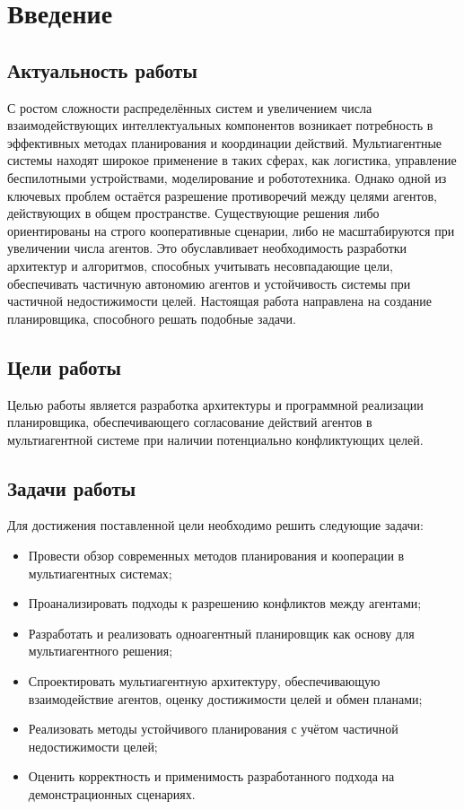 \chapter*{Введение}

\section*{Актуальность работы}

С ростом сложности распределённых систем и увеличением числа взаимодействующих
интеллектуальных компонентов возникает потребность
в эффективных методах планирования и координации действий.
Мультиагентные системы находят широкое применение в таких сферах,
как логистика, управление беспилотными устройствами,
моделирование и робототехника.
Однако одной из ключевых проблем остаётся разрешение противоречий между целями агентов,
действующих в общем пространстве. 
Существующие решения либо ориентированы на строго кооперативные сценарии,
либо не масштабируются при увеличении числа агентов.
Это обуславливает необходимость разработки архитектур и алгоритмов,
способных учитывать несовпадающие цели,
обеспечивать частичную автономию агентов и устойчивость системы
при частичной недостижимости целей.
Настоящая работа направлена на создание планировщика, способного решать подобные задачи.

\section*{Цели работы}

Целью работы является разработка архитектуры
и программной реализации планировщика,
обеспечивающего согласование действий агентов
в мультиагентной системе при наличии потенциально конфликтующих целей.

\section*{Задачи работы}

Для достижения поставленной цели необходимо решить следующие задачи:
\begin{itemize}
  \item Провести обзор современных методов планирования и кооперации в мультиагентных системах;
  \item Проанализировать подходы к разрешению конфликтов между агентами;
  \item Разработать и реализовать одноагентный планировщик как основу для мультиагентного решения;
  \item Спроектировать мультиагентную архитектуру,
    обеспечивающую взаимодействие агентов, оценку достижимости целей и обмен планами;
  \item Реализовать методы устойчивого планирования с учётом частичной недостижимости целей;
  \item Оценить корректность и применимость разработанного подхода на демонстрационных сценариях.
\end{itemize}

